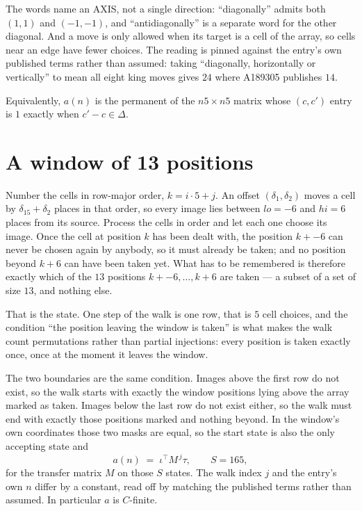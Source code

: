 \documentclass[11pt,a4paper]{article}
\theoremstyle{plain}
\theoremstyle{definition}
\begin{document}
The words name an AXIS, not a single direction: ``diagonally'' admits
both $(1,1)$ and $(-1,-1)$, and ``antidiagonally'' is a separate word for the other diagonal.
And a move is only allowed when its target is a cell of the array, so cells near an
edge have fewer choices. The reading is pinned against the entry's own published terms rather
than assumed: taking ``diagonally, horizontally or vertically'' to mean all eight king moves
gives $24$ where A189305 publishes $14$.

Equivalently, $a(n)$ is the permanent of the $n5\times n5$ matrix whose $(c,c')$ entry is
$1$ exactly when $c'-c\in\Delta$.

\section{A window of 13 positions}

Number the cells in row-major order, $k=i\cdot5+j$. An offset $(\delta_1,\delta_2)$ moves a
cell by $\delta_15+\delta_2$ places in that order, so every image lies between $lo=-6$ and
$hi=6$ places from its source. Process the cells in order and let each one choose its image.
Once the cell at position $k$ has been dealt with, the position $k+-6$ can never be chosen
again by anybody, so it must already be taken; and no position beyond $k+6$ can have been
taken yet. What has to be remembered is therefore exactly which of the $13$ positions
$k+-6,\dots,k+6$ are taken --- a subset of a set of size $13$, and nothing else.

That is the state. One step of the walk is one row, that is $5$ cell choices, and the
condition ``the position leaving the window is taken'' is what makes the walk count permutations
rather than partial injections: every position is taken exactly once, once at the moment it
leaves the window.

The two boundaries are the same condition. Images above the first row do not exist, so the walk
starts with exactly the window positions lying above the array marked as taken. Images below the
last row do not exist either, so the walk must end with exactly those positions marked and
nothing beyond. In the window's own coordinates those two masks are equal, so the start state is
also the only accepting state and
\[
a(n)\;=\;\iota^{\!\top}M^{\,j}\tau ,\qquad S=165,
\]
for the transfer matrix $M$ on those $S$ states. The walk index $j$ and the entry's own $n$
differ by a constant, read off by matching the published terms rather than assumed. In
particular $a$ is $C$-finite.
\end{document}
